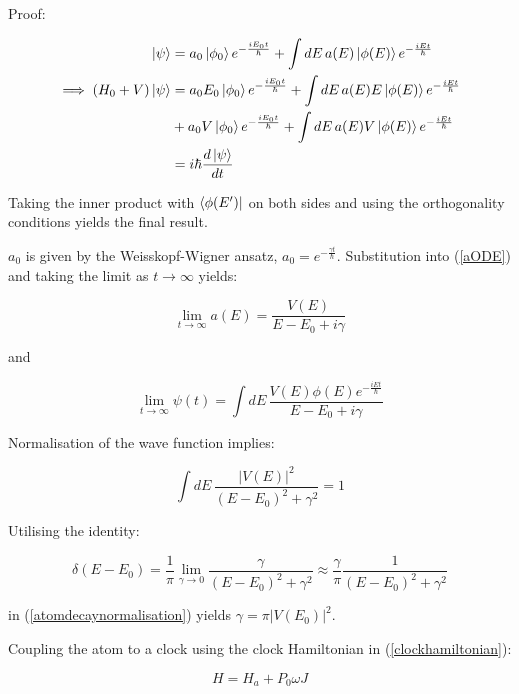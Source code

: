 \documentclass{article}
\begin{document}
\noindent Proof:

\begin{align}
	\ket{\psi} &= a_0\ket{\phi_0}e^{-\frac{iE_0t}{\hbar}}+\int dE\,a(E)\ket{\phi(E)}e^{-\frac{iEt}{\hbar}} \\
	\implies (H_0+V)\ket{\psi} &= a_0E_0\ket{\phi_0}e^{-\frac{iE_0t}{\hbar}}+\int dE\, a(E)E\ket{\phi(E)}e^{-\frac{iEt}{\hbar}} \\ 
				   &+a_0V\ket{\phi_0}e^{-\frac{iE_0t}{\hbar}}+\int dE\, a(E)V\ket{\phi(E)}e^{-\frac{iEt}{\hbar}} \nonumber\\
				   &= i\hbar \frac{d\ket{\psi}}{dt}
\end{align}

\noindent Taking the inner product with $\bra{\phi(E')}$ on both sides and using the orthogonality conditions yields the final result.

\noindent $a_0$ is given by the Weisskopf-Wigner ansatz, $a_0 = e^{-\frac{\gamma t}{\hbar}}$. Substitution into (\ref{aODE}) and taking the limit as $t \rightarrow \infty$ yields:

\begin{equation}
	\lim_{t\to\infty}a(E) = \frac{V(E)}{E-E_0+i\gamma}
\end{equation}

\noindent and 

\begin{equation}
	\lim_{t\to\infty}\psi(t) = \int dE\,\frac{V(E)\phi(E)e^{-\frac{iEt}{\hbar}}}{E-E_0+i\gamma}
\end{equation}

\noindent Normalisation of the wave function implies:

\begin{equation}
	\int dE\,\frac{|V(E)|^2}{(E-E_0)^2+\gamma^2}=1
	\label{atomdecaynormalisation}
\end{equation}

\noindent Utilising the identity:

\begin{equation}
	\delta(E-E_0) = \frac{1}{\pi} \lim_{\gamma\to 0}\frac{\gamma}{(E-E_0)^2+\gamma^2} \approx \frac{\gamma}{\pi} \frac{1}{(E-E_0)^2+\gamma^2}
\end{equation}

\noindent in (\ref{atomdecaynormalisation}) yields $\gamma = \pi|V(E_0)|^2$.

\noindent Coupling the atom to a clock using the clock Hamiltonian in (\ref{clockhamiltonian}):

\begin{equation}
	H = H_a+P_0\omega J
\end{equation}
\end{document}
